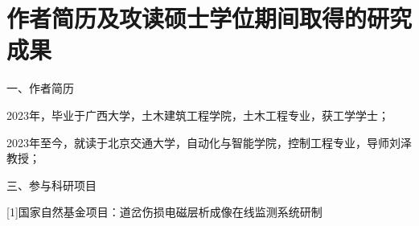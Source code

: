  \setlength{\baselineskip}{16pt}
\chapter{作者简历及攻读硕士学位期间取得的研究成果}
\setlength{\parindent}{0pt}


一、作者简历

2023年，毕业于广西大学，土木建筑工程学院，土木工程专业，获工学学士；

2023年至今，就读于北京交通大学，自动化与智能学院，控制工程专业，导师刘泽教授；





\vspace{10pt}
三、参与科研项目

[1]国家自然基金项目：道岔伤损电磁层析成像在线监测系统研制








%
%
%
%
%    
%

